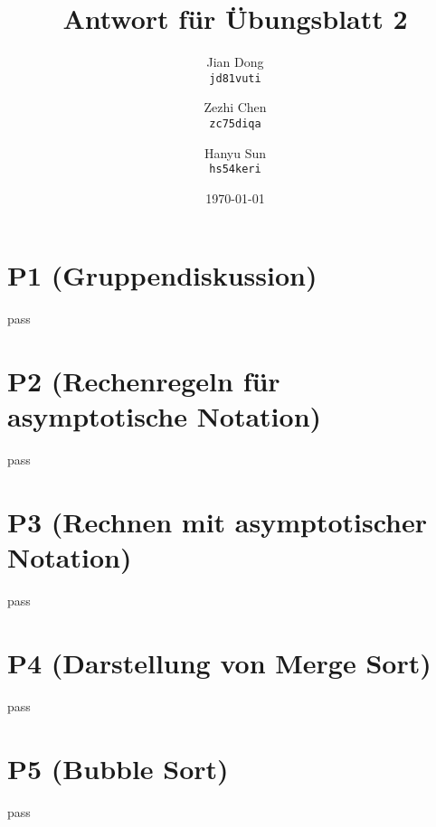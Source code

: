 \documentclass[a4paper,12pt]{article}
\begin{document}
\title{Antwort für Übungsblatt 2}
\author{
  Jian Dong\\
  \texttt{jd81vuti}
  \and
  Zezhi Chen\\
  \texttt{zc75diqa}
  \and
  Hanyu Sun\\
  \texttt{hs54keri}
}
\date{\today}
\maketitle

\section{P1 (Gruppendiskussion)}
pass

\section{P2 (Rechenregeln für asymptotische Notation)}
pass

\section{P3 (Rechnen mit asymptotischer Notation)}
pass

\section{P4 (Darstellung von Merge Sort)}
pass

\section{P5 (Bubble Sort)}
pass
\end{document}
